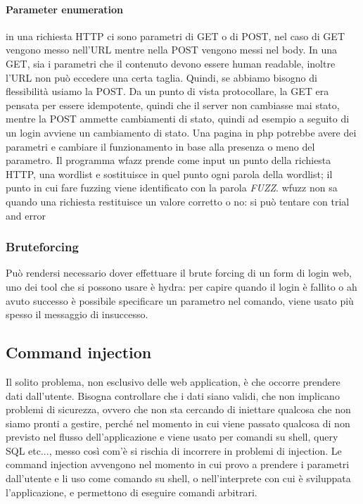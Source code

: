 \documentclass{article}
\begin{document}
\paragraph{Parameter enumeration}in una richiesta HTTP ci sono parametri di GET o di POST, nel caso di GET vengono messo nell'URL mentre nella POST vengono messi nel body. In una GET, sia i parametri che il contenuto devono essere human readable, inoltre l'URL non può eccedere una certa taglia. Quindi, se abbiamo bisogno di flessibilità usiamo la POST. Da un punto di vista protocollare, la GET era pensata per essere idempotente, quindi che il server non cambiasse mai stato, mentre la POST ammette cambiamenti di stato, quindi ad esempio a seguito di un login avviene un cambiamento di stato. Una pagina in php potrebbe avere dei parametri e cambiare il funzionamento in base alla presenza o meno del parametro. Il programma wfazz prende come input un punto della richiesta HTTP, una wordlist e sostituisce in quel punto ogni parola della wordlist; il punto in cui fare fuzzing viene identificato con la parola \textit{FUZZ}. wfuzz non sa quando una richiesta restituisce un valore corretto o no: si può tentare con trial and error
\subsubsection{Bruteforcing}
Può rendersi necessario dover effettuare il brute forcing di un form di login web, uno dei tool che si possono usare è hydra: per capire quando il login è fallito o ah avuto successo è possibile specificare un parametro nel comando, viene usato più spesso il messaggio di insuccesso.
\subsection{Command injection}
Il solito problema, non esclusivo delle web application, è che occorre prendere dati dall'utente. Bisogna controllare che i dati siano validi, che non implicano problemi di sicurezza, ovvero che non sta cercando di iniettare qualcosa che non siamo pronti a gestire, perché nel momento in cui viene passato qualcosa di non previsto nel flusso dell'applicazione e viene usato per comandi su shell, query SQL etc..., messo così com'è si rischia di incorrere in problemi di injection. Le command injection avvengono nel momento in cui provo a prendere i parametri dall'utente e li uso come comando su shell, o nell'interprete con cui è sviluppata l'applicazione, e permettono di eseguire comandi arbitrari.
\end{document}
